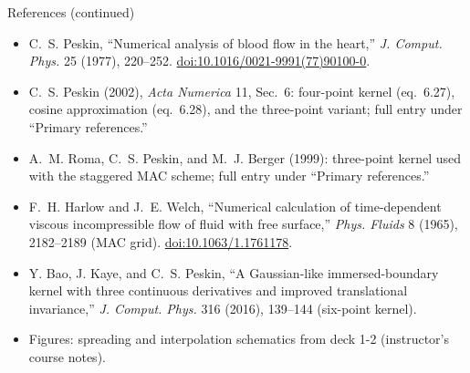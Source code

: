 \documentclass[aspectratio=169,11pt]{beamer}
\begin{document}
\begin{frame}{References (continued)}
\small
\begin{itemize}\itemsep5pt
  \item C.~S. Peskin, ``Numerical analysis of blood flow in the heart,'' \emph{J. Comput. Phys.} 25 (1977), 220--252.
  \href{https://doi.org/10.1016/0021-9991(77)90100-0}{doi:10.1016/0021-9991(77)90100-0}.
  \item C.~S. Peskin (2002), \emph{Acta Numerica} 11, Sec.~6: four-point kernel (eq.~6.27), cosine approximation (eq.~6.28), and the three-point variant; full entry under ``Primary references.''
  \item A.~M. Roma, C.~S. Peskin, and M.~J. Berger (1999): three-point kernel used with the staggered MAC scheme; full entry under ``Primary references.''
  \item F.~H. Harlow and J.~E. Welch, ``Numerical calculation of time-dependent viscous incompressible flow of fluid with free surface,'' \emph{Phys. Fluids} 8 (1965), 2182--2189 (MAC grid).
  \href{https://doi.org/10.1063/1.1761178}{doi:10.1063/1.1761178}.
  \item Y. Bao, J. Kaye, and C.~S. Peskin, ``A Gaussian-like immersed-boundary kernel with three continuous derivatives and improved translational invariance,'' \emph{J. Comput. Phys.} 316 (2016), 139--144 (six-point kernel).
  \item Figures: spreading and interpolation schematics from deck 1-2 (instructor's course notes).
\end{itemize}
\end{frame}
\end{document}
